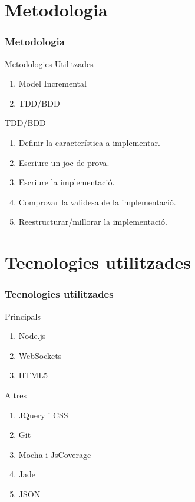 \documentclass[notitlepage]{beamer}
\begin{document}
\section{Metodologia}
\begin{frame}
\frametitle{Metodologia}
\begin{block}{Metodologies Utilitzades}
    \begin{enumerate}
    \item{Model Incremental}
    \item{TDD/BDD}
    \end{enumerate}
\end{block}
\begin{block}{TDD/BDD}
    \begin{enumerate}
    \item{Definir la característica a implementar.}
    \item{Escriure un joc de prova.}
    \item{Escriure la implementació.}
    \item{Comprovar la validesa de la implementació.}
    \item{Reestructurar/millorar la implementació.}
    \end{enumerate}
\end{block}
\end{frame}

\section{Tecnologies utilitzades}
\begin{frame}
\frametitle{Tecnologies utilitzades}
\begin{block}{Principals}
    \begin{enumerate}
    \item{Node.js}
    \item{WebSockets}
    \item{HTML5}
    \end{enumerate}
\end{block}
\begin{block}{Altres}
    \begin{enumerate}
    \item{JQuery i CSS}
    \item{Git}
    \item{Mocha i JsCoverage}
    \item{Jade}
    \item{JSON}
    \end{enumerate}
\end{block}
\end{frame}
\end{document}
